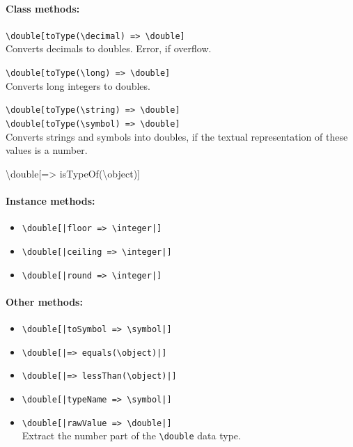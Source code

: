 \documentclass[11pt]{article}
\newcommand{\bs}{\textbackslash}
\begin{document}
\paragraph{Class methods:}
\begin{itemize}
\item {\tt \bs{}double[toType(\bs{}decimal) => \bs{}double]}\\  
  Converts decimals to doubles. Error, if overflow.
 \item {\tt \bs{}double[toType(\bs{}long) => \bs{}double]}\\  
  Converts long integers to doubles.
 \item {\tt \bs{}double[toType(\bs{}string) => \bs{}double]}\\  
 {\tt \bs{}double[toType(\bs{}symbol) => \bs{}double]}\\
  Converts strings and symbols into doubles, if the textual representation
  of these values is a number.
{\tt \item \bs{}double[=> isTypeOf(\bs{}object)]}  
\end{itemize}

\paragraph{Instance methods:}
\begin{itemize}
\item {\tt \bs{}double[|floor => \bs{}integer|]}
\item {\tt \bs{}double[|ceiling => \bs{}integer|]}
\item {\tt \bs{}double[|round => \bs{}integer|]}
\end{itemize}

\paragraph{Other methods:}
\begin{itemize}
\item {\tt \bs{}double[|toSymbol => \bs{}symbol|]}
\item {\tt \bs{}double[|=> equals(\bs{}object)|]}
\item {\tt \bs{}double[|=> lessThan(\bs{}object)|]}
\item {\tt \bs{}double[|typeName => \bs{}symbol|]}
\item {\tt \bs{}double[|rawValue => \bs{}double|]}
  \\
  Extract the number part of the {\tt \bs{}double} data type. 
\end{itemize}
\end{document}
